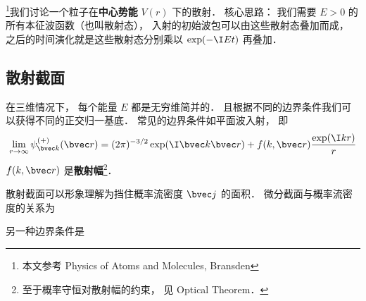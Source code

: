 
\footnote{本文参考 Physics of Atoms and Molecules, Bransden}我们讨论一个粒子在\textbf{中心势能} $V(r)$ 下的散射． 核心思路： 我们需要 $E > 0$ 的所有本征波函数（也叫散射态）， 入射的初始波包可以由这些散射态叠加而成， 之后的时间演化就是这些散射态分别乘以 $\exp(-\I E t)$ 再叠加．

\subsection{散射截面}

在三维情况下， 每个能量 $E$ 都是无穷维简并的． 且根据不同的边界条件我们可以获得不同的正交归一基底． 常见的边界条件如平面波入射， 即
\begin{equation}
\lim_{r \to \infty} \psi_{\bvec k}^{(+)}(\bvec r) = (2\pi)^{-3/2} \exp(\I \bvec k\bvec r) + f(k, \bvec r) \frac{\exp(\I k r)}{r}
\end{equation}
$f(k, \bvec r)$ 是\textbf{散射幅}\footnote{至于概率守恒对散射幅的约束， 见 Optical Theorem．}．

散射截面可以形象理解为挡住概率流密度 $\bvec j$ 的面积． 微分截面与概率流密度的关系为

另一种边界条件是
